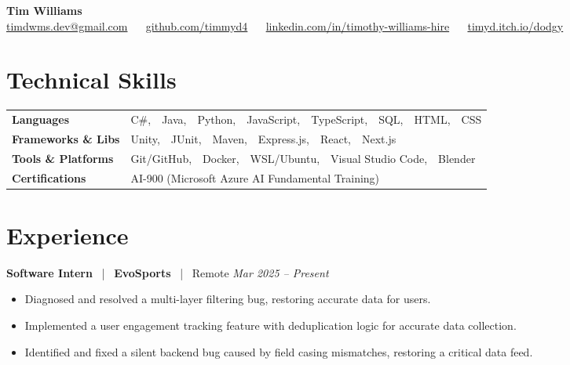 \documentclass[10pt, letterpaper]{article}
\newcommand{\jobhead}[4]{%
  \vspace{5pt}%
  {\bfseries\color{dark}#1}%
  ~{\color{light}|}~%
  {\bfseries\color{navy}#2}%
  ~{\color{light}|}~%
  {\color{light}#3}%
  \hfill{\color{light}\small\textit{#4}}\\[-2pt]%
}
\newcommand{\skillrow}[2]{%
  {\bfseries #1} & #2 \\[2pt]%
}
\begin{document}

\begin{center}
  {\huge\bfseries\color{navy} Tim Williams}\\[4pt]
  {\small\color{light}
    \href{mailto:timdwms.dev@gmail.com}{timdwms.dev@gmail.com}
    ~\textbullet~
    \href{https://github.com/timmyd4}{github.com/timmyd4}
    ~\textbullet~
    \href{https://www.linkedin.com/in/timothy-williams-hire}{linkedin.com/in/timothy-williams-hire}
    ~\textbullet~
    \href{https://timyd.itch.io/dodgy}{timyd.itch.io/dodgy}
  }
\end{center}

\vspace{2pt}

\section{Technical Skills}

\begin{tabular}{@{}p{1.6in} p{5.2in}@{}}
  \skillrow{Languages}{C\#,\ \ Java,\ \ Python,\ \ JavaScript,\ \ TypeScript,\ \ SQL,\ \ HTML,\ \ CSS}
  \skillrow{Frameworks \& Libs}{Unity,\ \ JUnit,\ \ Maven,\ \ Express.js,\ \ React,\ \ Next.js}
  \skillrow{Tools \& Platforms}{Git/GitHub,\ \ Docker,\ \ WSL/Ubuntu,\ \ Visual Studio Code,\ \ Blender}
  \skillrow{Certifications}{AI-900 (Microsoft Azure AI Fundamental Training)}
\end{tabular}

\section{Experience}

\jobhead{Software Intern}{EvoSports}{Remote}{Mar 2025 – Present}
\begin{itemize}
  \item Diagnosed and resolved a multi-layer filtering bug, restoring accurate data for users.
  \item Implemented a user engagement tracking feature with deduplication logic for accurate data collection.
  \item Identified and fixed a silent backend bug caused by field casing mismatches, restoring a critical data feed.
\end{itemize}
\end{document}
